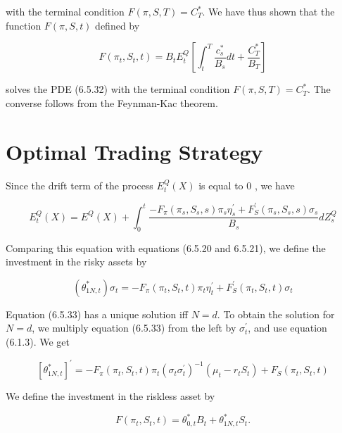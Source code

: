 \documentclass[\topdir/lecture\_notes.tex]{subfiles}
\begin{document}
with the terminal condition $F(\pi, S, T)=C_{T}^{*}$. We have thus shown that the function $F(\pi, S, t)$ defined by

\begin{equation}
F\left(\pi_{t}, S_{t}, t\right)=B_{t} E_{t}^{Q}\left[\int_{t}^{T} \frac{c_{s}^{*}}{B_{s}} d t+\frac{C_{T}^{*}}{B_{T}}\right]
\end{equation}

solves the PDE (6.5.32) with the terminal condition $F(\pi, S, T)=C_{T}^{*}$. The converse follows from the Feynman-Kac theorem.

\section{Optimal Trading Strategy}
Since the drift term of the process $E_{t}^{Q}(X)$ is equal to 0 , we have

\begin{equation}
E_{t}^{Q}(X)=E^{Q}(X)+\int_{0}^{t} \frac{-F_{\pi}\left(\pi_{s}, S_{s}, s\right) \pi_{s} \eta_{s}^{\prime}+F_{S}^{\prime}\left(\pi_{s}, S_{s}, s\right) \sigma_{s}}{B_{s}} d Z_{s}^{Q}
\end{equation}

Comparing this equation with equations (6.5.20 and 6.5.21), we define the investment in the risky assets by

\begin{equation}
\left(\theta_{1 N, t}^{*}\right) \sigma_{t}=-F_{\pi}\left(\pi_{t}, S_{t}, t\right) \pi_{t} \eta_{t}^{\prime}+F_{S}^{\prime}\left(\pi_{t}, S_{t}, t\right) \sigma_{t} \label{eq:6.5.33}
\end{equation}

Equation (6.5.33) has a unique solution iff $N=d$. To obtain the solution for $N=d$, we multiply equation (6.5.33) from the left by $\sigma_{t}^{\prime}$, and use equation (6.1.3). We get

\begin{equation}
\left[\theta_{1 N, t}^{*}\right]^{\prime}=-F_{\pi}\left(\pi_{t}, S_{t}, t\right) \pi_{t}\left(\sigma_{t} \sigma_{t}^{\prime}\right)^{-1}\left(\mu_{t}-r_{t} S_{t}\right)+F_{S}\left(\pi_{t}, S_{t}, t\right) \label{eq:6.5.34}
\end{equation}

We define the investment in the riskless asset by

\begin{equation}
F\left(\pi_{t}, S_{t}, t\right)=\theta_{0, t}^{*} B_{t}+\theta_{1 N, t}^{*} S_{t} .
\end{equation}
\end{document}

